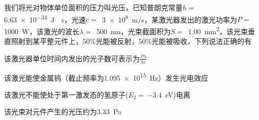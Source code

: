 我们将光对物体单位面积的压力叫光压，已知普朗克常量\(h =\) \,\qty{6.63e-34}{J\cdot s}，光速\(c =\) \,\qty{3e8}{m/s}，某激光器发出的激光功率为\(P =\) \,\qty{1000}{W}，该激光的波长\(\lambda =\) \,\qty{500}{nm}，光束截面积为\(S =\) \,\qty{1.00}{mm^2}，该光束垂直照射到某平整元件上，\(50\%\)光能被反射，\(50\%\)光能被吸收，下列说法正确的有\paren[]
\begin{choices}
	\item 该激光器单位时间内发出的光子数可表示为\(\frac{P\lambda}{hc}\)
	\item 该激光能使金属钨（截止频率为\qty{1.095e15}{Hz}）发生光电效应
	\item 该激光不能使处于第一激发态的氢原子(\(E_2 =\)\,\qty{-3.4}{eV})电离
	\item 该光束对元件产生的光压约为\qty{3.33}{Pa}
\end{choices}
\begin{answer}
    
\end{answer}